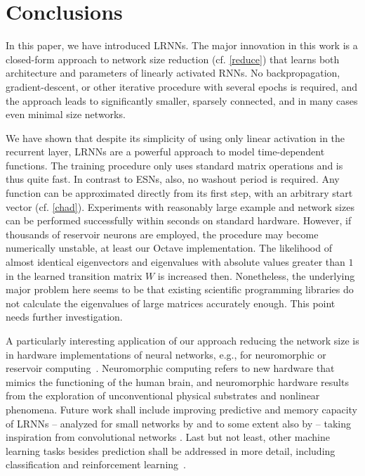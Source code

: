 \documentclass[twoside,11pt]{article}
\theoremstyle{definition}
\begin{document}
\section{Conclusions}\label{conclude}

In this paper, we have introduced LRNNs. The major innovation in this work is a
closed-form approach to network size reduction (cf.
\cref{reduce}) that learns both architecture and parameters of linearly activated RNNs.
No backpropagation, gradient-descent, or other iterative procedure with several
epochs is required, and the approach leads to significantly smaller, sparsely
connected, and in many cases even minimal size networks.

We have shown that despite its simplicity of using only linear activation in the
recurrent layer, LRNNs are a powerful approach to model time-dependent functions.
The training procedure only uses standard matrix operations and is thus quite fast.
In contrast to ESNs, also, no washout period is required. Any
function can be approximated directly from its first step, with an arbitrary
start vector (cf. \cref{chad}).
Experiments with reasonably large example and network sizes can be performed
successfully within seconds on standard hardware.
However, if thousands of reservoir neurons are employed, the procedure may
become numerically unstable, at least our Octave implementation. The likelihood
of almost identical eigenvectors and eigenvalues with absolute values greater
than $1$ in the learned transition matrix $W$ is increased then. Nonetheless,
the underlying major problem here seems to be that existing scientific
programming libraries do not calculate the eigenvalues of large matrices
accurately enough. This point needs further investigation.

A particularly interesting application of our approach reducing the network size
is in hardware implementations of neural networks, e.g., for neuromorphic or
reservoir computing~\citep{Mea90,IL+11,LL17}. Neuromorphic computing refers to
new hardware that mimics the functioning of the human brain, and neuromorphic
hardware results from the exploration of unconventional physical substrates
and nonlinear phenomena. Future work shall include improving predictive and
memory capacity of LRNNs -- analyzed for small networks by \citet{Mar17} and to
some extent also by \citet{CW+16} -- taking inspiration from convolutional
networks \citep{GBC16}. Last but not least, other machine learning tasks besides
prediction shall be addressed in more detail, including classification and
reinforcement learning~\citep{SB18,PGL17}.
\end{document}
